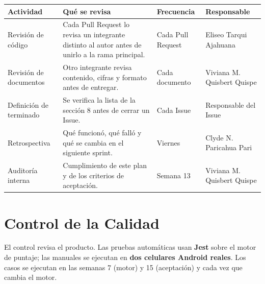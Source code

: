 \documentclass[11pt,a4paper]{article}
\begin{document}
\vspace{0.1cm}
{\small
{}
\noindent\begin{tabularx}{\textwidth}{@{}P{3.4cm} L P{2.5cm} P{2.3cm}@{}}
\toprule
{}
\textbf{Actividad} & \textbf{Qué se revisa} & \textbf{Frecuencia} & \textbf{Responsable} \\
\midrule
Revisión de código & Cada Pull Request lo revisa un integrante distinto al autor antes de unirlo a la rama principal. & Cada Pull Request & Eliseo Tarqui Ajahuana \\
Revisión de documentos & Otro integrante revisa contenido, cifras y formato antes de entregar. & Cada documento & Viviana M. Quisbert Quispe \\
Definición de terminado & Se verifica la lista de la sección 8 antes de cerrar un Issue. & Cada Issue & Responsable del Issue \\
Retrospectiva & Qué funcionó, qué falló y qué se cambia en el siguiente sprint. & Viernes & Clyde N. Paricahua Pari \\
Auditoría interna & Cumplimiento de este plan y de los criterios de aceptación. & Semana 13 & Viviana M. Quisbert Quispe \\
\bottomrule
\end{tabularx}
}

\section{Control de la Calidad}
El control revisa el producto. Las pruebas automáticas usan \textbf{Jest} sobre el motor de puntaje; las manuales se ejecutan en \textbf{dos celulares Android reales}. Los casos se ejecutan en las semanas 7 (motor) y 15 (aceptación) y cada vez que cambia el motor.
\end{document}
